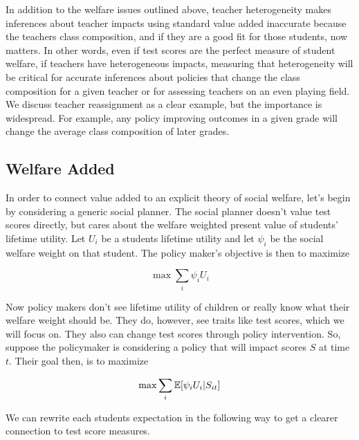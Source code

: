 \documentclass{article}
\theoremstyle{definition}
\theoremstyle{definition}
\theoremstyle{definition}
\theoremstyle{definition}
\begin{document}
In addition to the welfare issues outlined above, teacher heterogeneity makes inferences about teacher impacts using standard value added inaccurate because the teachers class composition, and if they are a good fit for those students, now matters. In other words, even if test scores are the perfect measure of student welfare, if teachers have heterogeneous impacts, measuring that heterogeneity will be critical for accurate inferences about policies that change the class composition for a given teacher or for assessing teachers on an even playing field. We discuss teacher reassignment as a clear example, but the importance is widespread. For example, any policy improving outcomes in a given grade will change the average class composition of later grades. 
    
    \subsection{Welfare Added }
    
    In order to connect value added to an explicit theory of social welfare, let's begin by considering a generic social planner. The social planner doesn't value test scores directly, but cares about the welfare weighted present value of students' lifetime utility. Let $U_i$ be a students lifetime utility and let $\psi_i$ be the social welfare weight on that student. The policy maker's objective is then to maximize
    
    \begin{equation}
     \max \sum_i \psi_i U_{i}
    \end{equation}
    
  Now policy makers don't see lifetime utility of children or really know what their welfare weight should be. They do, however, see traits like test scores, which we will focus on. They also can change test scores through policy intervention. So, suppose the policymaker is considering a policy that will impact scores $S$ at time $t$. Their goal then, is to maximize 
 
     \begin{equation}
     \max \sum_i \mathbb{E}[ \psi_i U_{i} |S_{it}]
    \end{equation}
    
    We can rewrite each students expectation in the following way to get a clearer connection to test score measures. 
    
\end{document}
